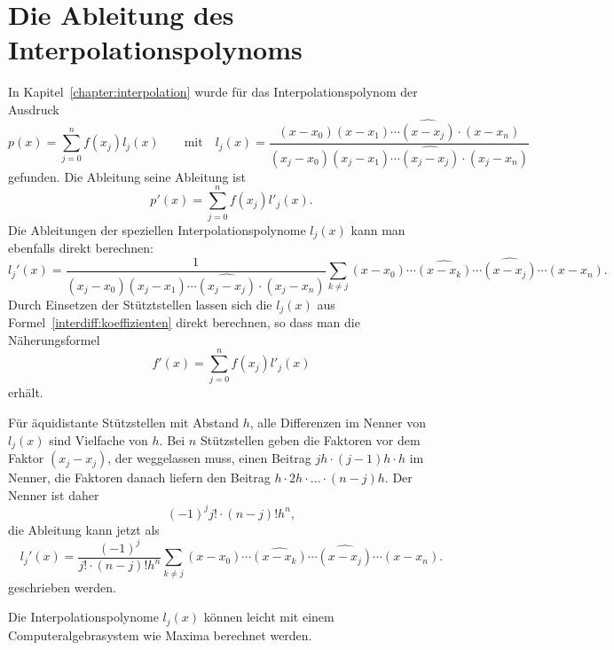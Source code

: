 \section{Die Ableitung des Interpolationspolynoms}
In Kapitel~\ref{chapter:interpolation} wurde für das Interpolationspolynom
der Ausdruck
\[
p(x)
=
\sum_{j=0}^n f(x_j) l_j(x)
\qquad\text{mit}\quad
l_j(x)
=
\frac{(x-x_0)(x-x_1)\cdots\widehat{(x-x_j)}\cdot (x-x_n)}{(x_j-x_0)(x_j-x_1)\cdots\widehat{(x_j-x_j)}\cdot (x_j-x_n)}
\]
gefunden.
Die Ableitung seine Ableitung ist
\[
p'(x)
=
\sum_{j=0}^n f(x_j) l'_j(x).
\]
Die Ableitungen der speziellen Interpolationspolynome $l_j(x)$ kann
man ebenfalls direkt berechnen:
\begin{equation}
l_j'(x)
=
\frac{1}{(x_j-x_0)(x_j-x_1)\cdots\widehat{(x_j-x_j)}\cdot (x_j-x_n)}
\sum_{k\ne j} (x-x_0)\cdots \widehat{(x-x_k)}\cdots\widehat{(x-x_j)}\cdots (x-x_n).
\label{interdiff:koeffizienten}
\end{equation}
Durch Einsetzen der Stütztstellen lassen sich die $l_j(x)$ aus
Formel~\eqref{interdiff:koeffizienten} direkt berechnen, so dass
man die Näherungsformel 
\begin{equation}
f'(x) = \sum_{j=0}^n f(x_j) l'_j(x)
\label{interdiff:ableitung}
\end{equation}
erhält.

Für äquidistante Stützstellen mit Abstand $h$, alle Differenzen im
Nenner von $l_j(x)$ sind Vielfache von $h$.
Bei $n$ Stützstellen geben die Faktoren vor dem Faktor $(x_j-x_j)$, der
weggelassen muss, einen Beitrag $jh\cdot (j-1)h \cdot h$ im Nenner,
die Faktoren danach liefern den Beitrag $h\cdot 2h\cdot \dots\cdot (n-j)h$.
Der Nenner ist daher
\[
(-1)^j
j!\cdot (n-j)! h^n,
\]
die Ableitung kann jetzt als
\begin{equation}
l_j'(x)
=
\frac{(-1)^j}{j!\cdot (n-j)! h^n}
\sum_{k\ne j} (x-x_0)\cdots \widehat{(x-x_k)}\cdots\widehat{(x-x_j)}\cdots (x-x_n).
\label{interdiff:koeffizienten2}
\end{equation}
geschrieben werden.

Die Interpolationspolynome $l_j(x)$ können leicht mit einem
Computeralgebrasystem wie Maxima berechnet werden.

